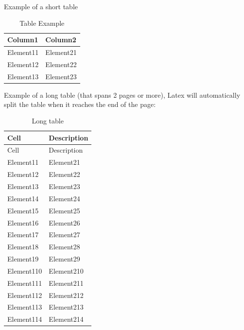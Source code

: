 Example of a short table


\begin{table}[H]
    \centering
    \begin{tabular}{|m{5cm}|m{10cm}|}
        \hline
          Column1 & Column2 \\
        \hline
          Element11 & Element21 \\
        \hline
          Element12 & Element22 \\
        \hline
          Element13 & Element23 \\
        \hline
    \end{tabular}
    \caption{Table Example}
\end{table}


Example of a long table (that spans 2 pages or more), Latex will automatically split the table when it reaches the end of the page:

\begin{longtable}[c]{| m{4.4cm} | m{11cm} |}
\caption{Long table}\\
 \hline

 Cell & Description  \\ 
 \hline
 \endfirsthead

 \hline
 
 Cell & Description  \\ 
 \hline
 \endhead

        \hline
          Element11 & Element21 \\
        \hline
          Element12 & Element22 \\
        \hline
          Element13 & Element23 \\
        \hline
          Element14 & Element24 \\
        \hline
          Element15 & Element25 \\
        \hline
          Element16 & Element26 \\
        \hline
          Element17 & Element27 \\
        \hline
          Element18 & Element28 \\
        \hline
          Element19 & Element29 \\
        \hline
          Element110 & Element210 \\
        \hline
          Element111 & Element211 \\
        \hline
          Element112 & Element212 \\
        \hline
          Element113 & Element213 \\
        \hline
          Element114 & Element214 \\
        \hline

 \end{longtable}


